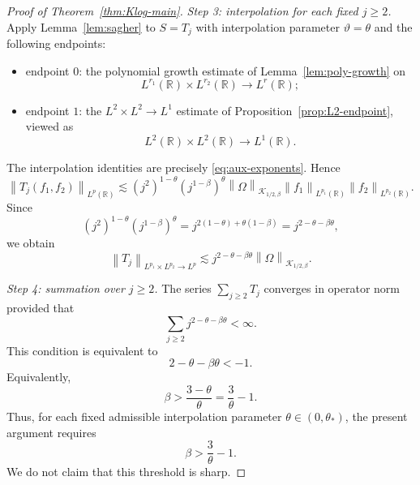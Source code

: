 \documentclass[11pt]{amsart}
\theoremstyle{remark}
\numberwithin{equation}{section}
\newcommand{\R}{\mathbb R}
\newcommand{\cK}{\mathcal K}
\newcommand{\norm}[1]{\left\lVert #1\right\rVert}
\begin{document}
\begin{proof}[Proof of Theorem~\ref{thm:Klog-main}]
		\smallskip
		\noindent\emph{Step 3: interpolation for each fixed \(j\ge2\).}
		Apply Lemma~\ref{lem:sagher} to \(S=T_j\) with interpolation parameter
		\(\vartheta=\theta\) and the following endpoints:
		\begin{itemize}
			\item endpoint \(0\): the polynomial growth estimate of
			Lemma~\ref{lem:poly-growth} on
			\[
			L^{r_1}(\R)\times L^{r_2}(\R)\to L^r(\R);
			\]
			\item endpoint \(1\): the \(L^2\times L^2\to L^1\) estimate of
			Proposition~\ref{prop:L2-endpoint}, viewed as
			\[
			L^2(\R)\times L^2(\R)\to L^1(\R).
			\]
		\end{itemize}
		The interpolation identities are precisely \eqref{eq:aux-exponents}. Hence
		\begin{equation}\label{eq:interp-j}
			\norm{T_j(f_1,f_2)}_{L^p(\R)}
			\lesssim
			(j^2)^{1-\theta}(j^{1-\beta})^{\theta}
			\norm{\Omega}_{\cK_{1/2,\beta}}
			\norm{f_1}_{L^{p_1}(\R)}\norm{f_2}_{L^{p_2}(\R)}.
		\end{equation}
		Since
		\[
		(j^2)^{1-\theta}(j^{1-\beta})^\theta
		=
		j^{2(1-\theta)+\theta(1-\beta)}
		=
		j^{2-\theta-\beta\theta},
		\]
		we obtain
		\begin{equation}\label{eq:interp-j-simplified}
			\norm{T_j}_{L^{p_1}\times L^{p_2}\to L^p}
			\lesssim
			j^{2-\theta-\beta\theta}
			\norm{\Omega}_{\cK_{1/2,\beta}}.
		\end{equation}
		
		\smallskip
		\noindent\emph{Step 4: summation over \(j\ge2\).}
		The series \(\sum_{j\ge2}T_j\) converges in operator norm provided that
		\[
		\sum_{j\ge2} j^{2-\theta-\beta\theta}<\infty.
		\]
		This condition is equivalent to
		\begin{equation}\label{eq:beta-condition-final}
			2-\theta-\beta\theta<-1.
		\end{equation}
		Equivalently,
		\begin{equation}\label{eq:beta-condition-theta}
			\beta>\frac{3-\theta}{\theta}=\frac3\theta-1.
		\end{equation}
		Thus, for each fixed admissible interpolation parameter
		\(\theta\in(0,\theta_*)\), the present argument requires
		\[
		\beta>\frac3\theta-1.
		\]
		We do not claim that this threshold is sharp.
		

\end{proof}
\end{document}
